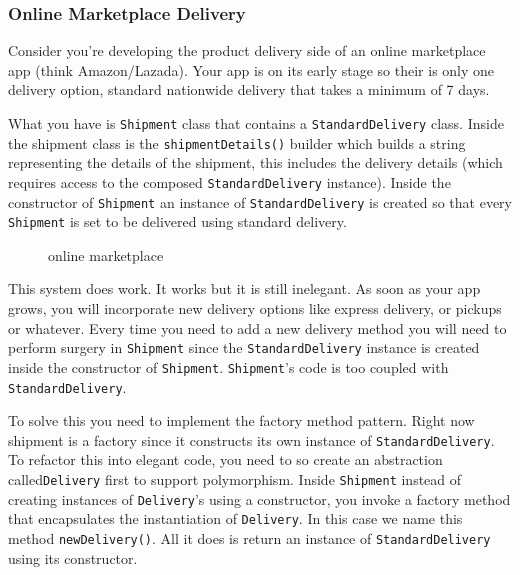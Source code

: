 \subsubsection{Online Marketplace
Delivery}\label{creational-patterns.md__online-marketplace-delivery}

Consider you're developing the product delivery side of an online
marketplace app (think Amazon/Lazada). Your app is on its early stage so
their is only one delivery option, standard nationwide delivery that
takes a minimum of 7 days.

What you have is \texttt{Shipment} class that contains a
\texttt{StandardDelivery} class. Inside the shipment class is the
\texttt{shipmentDetails()} builder which builds a string representing
the details of the shipment, this includes the delivery details (which
requires access to the composed \texttt{StandardDelivery} instance).
Inside the constructor of \texttt{Shipment} an instance of
\texttt{StandardDelivery} is created so that every \texttt{Shipment} is
set to be delivered using standard delivery.

\begin{figure}
\centering
{}
\caption{online marketplace}
\end{figure}

This system does work. It works but it is still inelegant. As soon as
your app grows, you will incorporate new delivery options like express
delivery, or pickups or whatever. Every time you need to add a new
delivery method you will need to perform surgery in \texttt{Shipment}
since the \texttt{StandardDelivery} instance is created inside the
constructor of \texttt{Shipment}. \texttt{Shipment}'s code is too
coupled with \texttt{StandardDelivery}.

To solve this you need to implement the factory method pattern. Right
now shipment is a factory since it constructs its own instance of
\texttt{StandardDelivery}. To refactor this into elegant code, you need
to so create an abstraction called\texttt{Delivery} first to support
polymorphism. Inside \texttt{Shipment} instead of creating instances of
\texttt{Delivery}'s using a constructor, you invoke a factory method
that encapsulates the instantiation of \texttt{Delivery}. In this case
we name this method \texttt{newDelivery()}. All it does is return an
instance of \texttt{StandardDelivery} using its constructor.

